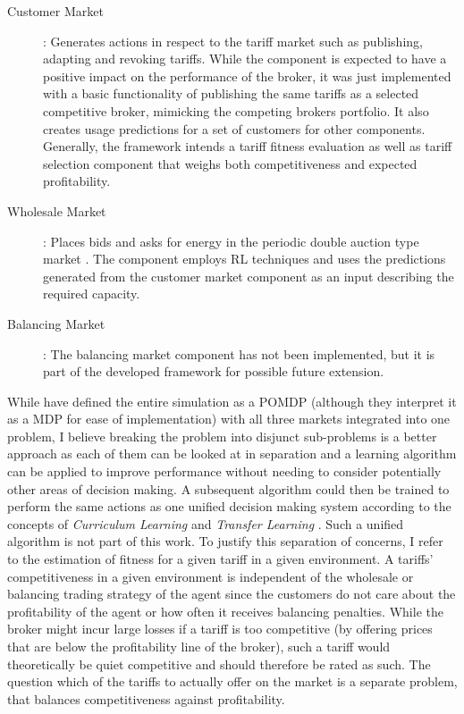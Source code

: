 \begin{description}
    \item[Customer Market]: Generates actions in respect to the tariff market such as publishing,
        adapting and revoking tariffs. While the component is expected to have a positive impact on the performance of
        the broker, it was just implemented with a basic functionality of publishing the same tariffs as a selected
        competitive broker, mimicking the competing brokers portfolio. It also creates usage predictions for a set of
        customers for other components. Generally, the framework intends a tariff fitness evaluation as well as tariff
        selection component that weighs both competitiveness and expected profitability.

    \item[Wholesale Market]: Places bids and asks for energy in the periodic double
        auction type market \citep{ketter2018powertac}. The component employs \ac {RL} techniques and uses the
        predictions generated from the customer market component as an input describing the required capacity.

    \item[Balancing Market]: The balancing market component has not been implemented, but it is part of the
developed framework for possible future extension.  \end{description}

While \citep{tactexurieli2016mdp} have defined the entire simulation as a \ac {POMDP} (although they interpret it as a
\ac {MDP} for ease of implementation) with all three markets integrated into one problem, I believe breaking the problem
into disjunct sub-problems is a better approach as each of them can be looked at in separation and a learning algorithm
can be applied to improve performance without needing to consider potentially other areas of decision making. A
subsequent algorithm could then be trained to perform the same actions as one unified decision making system according
to the concepts of \emph{Curriculum Learning}\citep{matiisen2017teacher} and \emph{Transfer Learning}
\citep{parisotto2015actor}. Such a unified algorithm is not part of this work.
To justify this separation of concerns, I refer to the estimation of fitness for a given tariff in a given environment. A tariffs' competitiveness in a
given environment is independent of the wholesale or balancing trading strategy of the agent since the customers do not
care about the profitability of the agent or how often it receives balancing penalties. While the broker might incur
large losses if a tariff is too competitive (by offering prices that are below the profitability line of the broker),
such a tariff would theoretically be quiet competitive and should therefore be rated as such. The question which of the
tariffs to actually offer on the market is a separate problem, that balances competitiveness against profitability.


